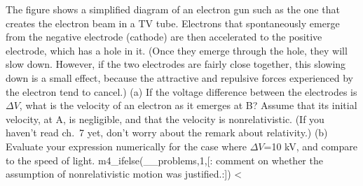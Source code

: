 The figure shows a simplified diagram of an electron
        gun such as the 
        one that creates the electron beam in a TV tube. Electrons
        that spontaneously emerge from the negative electrode
        (cathode) are then accelerated to the positive electrode,
        which has a hole in it. (Once they emerge through the hole,
        they will slow down. However, if the two electrodes are
        fairly close together, this slowing down is a small effect,
        because the attractive and repulsive forces experienced by
        the electron tend to cancel.) \hwendpart
        (a) If the voltage difference
        between the electrodes is $\Delta V$, what is the velocity
        of an electron as it emerges at B? Assume that its initial
        velocity, at A, is negligible, and that the velocity is nonrelativistic. 
        (If you haven't read ch.~7 yet, don't worry about the remark about
        relativity.)
        \answercheck\hwendpart
        (b) Evaluate your
        expression numerically for the case where $\Delta V$=10 kV,
        and compare to the speed of light.
        m4_ifelse(__problems,1,[:%
        comment on whether the assumption
        of nonrelativistic motion was justified.:])%
        <%
